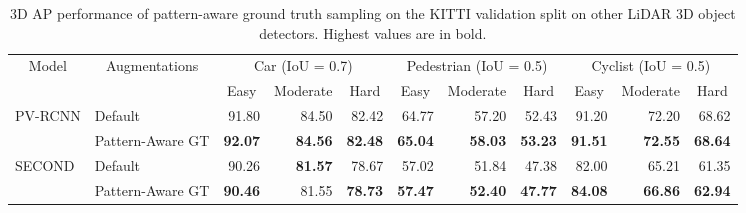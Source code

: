 \documentclass[10pt, conference, compsocconf]{IEEEtran}
\begin{document}
\begin{table*}[]
\centering
\caption{3D AP performance of pattern-aware ground truth sampling on the KITTI validation split on other LiDAR 3D object detectors. Highest values are in bold.}
\label{tab:general-AP}
\begin{tabular}{l|l|rrr|rrr|rrr}
\hline
\multicolumn{1}{c|}{\multirow{2}{*}{Model}} & \multicolumn{1}{c|}{\multirow{2}{*}{Augmentations}} & \multicolumn{3}{c|}{Car (IoU = 0.7)}                                                & \multicolumn{3}{c|}{Pedestrian (IoU = 0.5)}                                         & \multicolumn{3}{c}{Cyclist (IoU = 0.5)}                                            \\
\multicolumn{1}{c|}{}                       & \multicolumn{1}{c|}{}                               & \multicolumn{1}{c}{Easy} & \multicolumn{1}{c}{Moderate} & \multicolumn{1}{c|}{Hard} & \multicolumn{1}{c}{Easy} & \multicolumn{1}{c}{Moderate} & \multicolumn{1}{c|}{Hard} & \multicolumn{1}{c}{Easy} & \multicolumn{1}{c}{Moderate} & \multicolumn{1}{c}{Hard} \\ \hline
PV-RCNN                                     & Default                                             & 91.80                    & 84.50                        & 82.42                     & 64.77                    & 57.20                        & 52.43                     & 91.20                    & 72.20                        & 68.62                    \\
                                            & Pattern-Aware GT                                    & \textbf{92.07}           & \textbf{84.56}               & \textbf{82.48}            & \textbf{65.04}           & \textbf{58.03}               & \textbf{53.23}            & \textbf{91.51}           & \textbf{72.55}               & \textbf{68.64}           \\ \hline
SECOND                                      & Default                                             & 90.26                    & \textbf{81.57}               & 78.67                     & 57.02                    & 51.84                        & 47.38                     & 82.00                    & 65.21                        & 61.35                    \\
                                            & Pattern-Aware GT                                    & \textbf{90.46}           & 81.55                        & \textbf{78.73}            & \textbf{57.47}           & \textbf{52.40}               & \textbf{47.77}            & \textbf{84.08}           & \textbf{66.86}               & \textbf{62.94}           \\ \hline

\end{tabular}
\end{table*}
\end{document}
